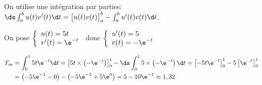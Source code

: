 On utilise une intégration par parties:
$\ds\int_{a}^{b} u(t)v'(t)\d t =\left [ u(t)v(t)\strut \right ]_{a}^{b} -\int_{a}^{b} u'(t) v(t) \d t$.

On pose
$\left \{
\begin{array}{l}
u(t)=5t\\
v'(t)=\e^{-t}
\end{array}
\right .$
donc
$\left \{
\begin{array}{l}
u'(t)=5\\
v(t)= - \e^{-t}
\end{array}
\right .$

$\begin{aligned}[t]
T_m
& = \displaystyle\int_0^1 5t\e^{-t} \d t
 = \left [5t\times \left (-\e^{-t} \right )\right ]_{0}^{1}- \ds\int_{0}^{1} 5\times \left ( -\e^{-t} \right ) \d t
  = \left [-5 t\e^{-t} \right ]_{0}^{1}- 5\left [ \e^{-t} \right ]_{0}^{1}\\
& = \left (-5\e^{-1}-0\right )-\left (-5\e^{-1} + 5\e^{0} \right )
= 5-10\e^{-1} \approx 1,32
\end{aligned}$



\bigskip
